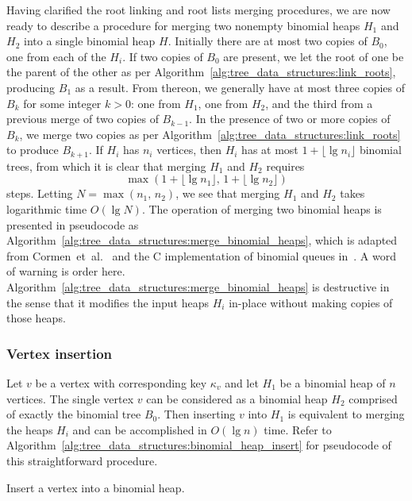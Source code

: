 Having clarified the root linking and root lists merging procedures,
we are now ready to describe a procedure for merging two nonempty
binomial heaps $H_1$ and $H_2$ into a single binomial heap
$H$. Initially there are at most two copies of $B_0$, one from each of
the $H_i$. If two copies of $B_0$ are present, we let the root of one
be the parent of the other as per
Algorithm~\ref{alg:tree_data_structures:link_roots}, producing $B_1$
as a result. From thereon, we generally have at most three copies of
$B_k$ for some integer $k > 0$: one from $H_1$, one from $H_2$, and
the third from a previous merge of two copies of $B_{k-1}$. In the
presence of two or more copies of $B_k$, we merge two copies as per
Algorithm~\ref{alg:tree_data_structures:link_roots} to produce
$B_{k+1}$. If $H_i$ has $n_i$ vertices, then $H_i$ has at most
$1 + \lfloor \lg n_i \rfloor$ binomial trees, from which it is clear
that merging $H_1$ and $H_2$ requires
\[
\max(1 + \lfloor \lg n_1 \rfloor,\, 1 + \lfloor \lg n_2 \rfloor)
\]
steps. Letting $N = \max(n_1,\, n_2)$, we see that merging $H_1$ and
$H_2$ takes logarithmic time $O(\lg N)$. The operation of merging two
binomial heaps is presented in pseudocode as
Algorithm~\ref{alg:tree_data_structures:merge_binomial_heaps}, which
is adapted from Cormen~et~al.~\cite[p.463]{CormenEtAl2001} and the C
implementation of binomial queues in~\cite{Howard2010}. A word of
warning is order here.
Algorithm~\ref{alg:tree_data_structures:merge_binomial_heaps} is
destructive in the sense that it modifies the input heaps $H_i$
in-place without making copies of those heaps.



\subsubsection{Vertex insertion}

Let $v$ be a vertex with corresponding key $\kappa_v$ and let $H_1$ be
a binomial heap of $n$ vertices. The single vertex $v$ can be
considered as a binomial heap $H_2$ comprised of exactly the binomial
tree $B_0$. Then inserting $v$ into $H_1$ is equivalent to merging the
heaps $H_i$ and can be accomplished in $O(\lg n)$ time. Refer to
Algorithm~\ref{alg:tree_data_structures:binomial_heap_insert} for
pseudocode of this straightforward procedure.

\begin{algorithm}[!htbp]

\caption{Insert a vertex into a binomial heap.}
\label{alg:tree_data_structures:binomial_heap_insert}
\end{algorithm}


